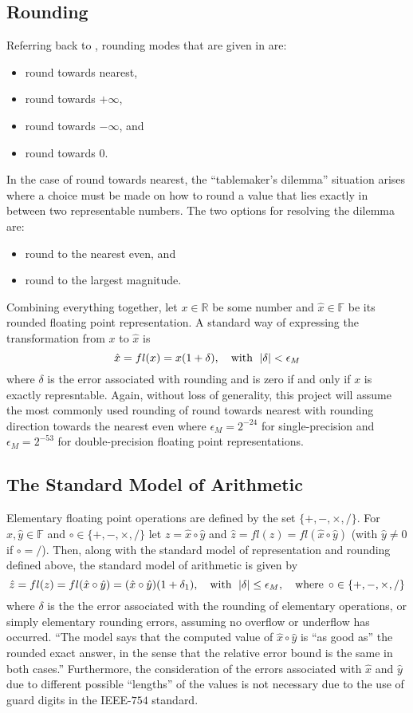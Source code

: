 \documentclass{standalone}
\begin{document}
	\subsection{Rounding}
	Referring back to \cite{boldo2015verified}, rounding modes that are given in \cite{zuras2008ieee} are:
	\begin{itemize}
		\item round towards nearest,
		\item round towards $+\infty$,
		\item round towards $-\infty$, and
		\item round towards $0$.
	\end{itemize}
	In the case of round towards nearest, the ``tablemaker's dilemma'' situation arises where a choice must be made on how to round a value that lies exactly in between two representable numbers. The two options for resolving the dilemma are:
	\begin{itemize}
		\item round to the nearest even, and
		\item round to the largest magnitude.
	\end{itemize}
	Combining everything together, let $x\in\mathbb{R}$ be some number and $\hat{x}\in\mathbb{F}$ be its rounded floating point representation. A standard way of expressing the transformation from $x$ to $\hat{x}$ is$$\hat{x}=fl(x)=x(1+\delta),\quad\text{with}\:\:\left|\delta\right|<\epsilon_{M}$$where $\delta$ is the error associated with rounding and is zero if and only if $x$ is exactly represntable. Again, without loss of generality, this project will assume the most commonly used rounding of round towards nearest with rounding direction towards the nearest even where $\epsilon_{M}=2^{-24}$ for single-precision and $\epsilon_{M}=2^{-53}$ for double-precision floating point representations.
	\subsection{The Standard Model of Arithmetic}
	Elementary floating point operations are defined by the set $\{+,-,\times,/\}$. For $\hat{x},\hat{y}\in\mathbb{F}$ and $\circ\in\{+,-,\times,/\}$ let $z=\hat{x}\circ\hat{y}$ and $\hat{z}=fl(z)=fl(\hat{x}\circ\hat{y})$ (with $\hat{y}\ne0$ if $\circ=/$). Then, along with the standard model of representation and rounding defined above, the standard model of arithmetic is given by$$\hat{z}=fl(z)=fl(\hat{x}\circ\hat{y})=(\hat{x}\circ\hat{y})(1+\delta_{1}),\quad\text{with}\:\:\left|\delta\right|\le\epsilon_{M},\quad\text{where}\:\:\circ\in\{+,-,\times,/\}$$where $\delta$ is the the error associated with the rounding of elementary operations, or simply elementary rounding errors, assuming no overflow or underflow has occurred. \cite{higham2002accuracy} ``The model says that the computed value of $\hat{x}\circ\hat{y}$ is ``as good as'' the rounded exact answer, in the sense that the relative error bound is the same in both cases.'' \cite{higham2002accuracy} Furthermore, the consideration of the errors associated with $\hat{x}$ and $\hat{y}$ due to different possible ``lengths'' of the values is not necessary due to the use of guard digits in the IEEE-$754$ standard. \cite{higham2002accuracy}
\end{document}
